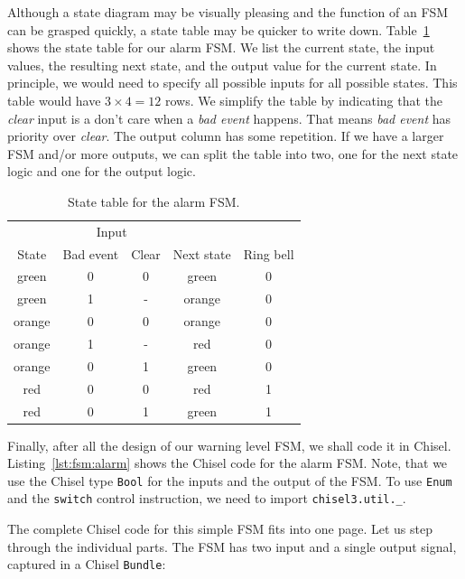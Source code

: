 \documentclass[%
    10pt,
    headinclude, footexclude,
    openright, %
    notitlepage,
    cleardoubleempty,
    headsepline,
    pointlessnumbers,
    bibtotoc, idxtotoc,
    ]{scrbook}
\newcommand{\code}[1]{{\small{\texttt{#1}}}}
\begin{document}
Although a state diagram may be visually pleasing and the function of an FSM
can be grasped quickly, a state table may be quicker to write down.
Table~\ref{tab:state:table} shows the state table for our alarm FSM.
We list the current state, the input values, the resulting next state, and
the output value for the current state. In principle, we would need to
specify all possible inputs for all possible states. This table would have
$3 \times 4 = 12$ rows. We simplify the table by indicating that the \emph{clear}
input is a don't care when a \emph{bad event} happens. That means
\emph{bad event} has priority over \emph{clear}. The output column
has some repetition. If we have a larger FSM and/or more outputs, we
can split the table into two, one for the next state logic and one for the
output logic.

\begin{table}
\centering
\caption{State table for the alarm FSM.}
\begin{tabular}{ccccc}
\toprule
& \multicolumn{2}{c}{Input} \\
\cmidrule{2-3}
State &  Bad event & Clear & Next state & Ring bell \\
\midrule
green & 0 & 0 & green & 0 \\
green & 1 & - & orange & 0 \\
orange & 0 & 0 & orange & 0 \\
orange & 1 & - & red & 0 \\
orange & 0 & 1 & green & 0 \\
red & 0 & 0 & red & 1 \\
red & 0 & 1 & green & 1 \\
\bottomrule
\end{tabular}
\label{tab:state:table}
\end{table}

Finally, after all the design of our warning level FSM, we shall code it in Chisel.
Listing~\ref{lst:fsm:alarm} shows the Chisel code for the alarm FSM.
Note, that we use the Chisel type \code{Bool} for the inputs and the
output of the FSM.
To use \code{Enum} and the \code{switch} control instruction, we need to
import \code{chisel3.util.\_}.


The complete Chisel code for this simple FSM fits into one page.
Let us step through the individual parts.
The FSM has two input and a single output signal, captured in a Chisel \code{Bundle}:
%
\end{document}
